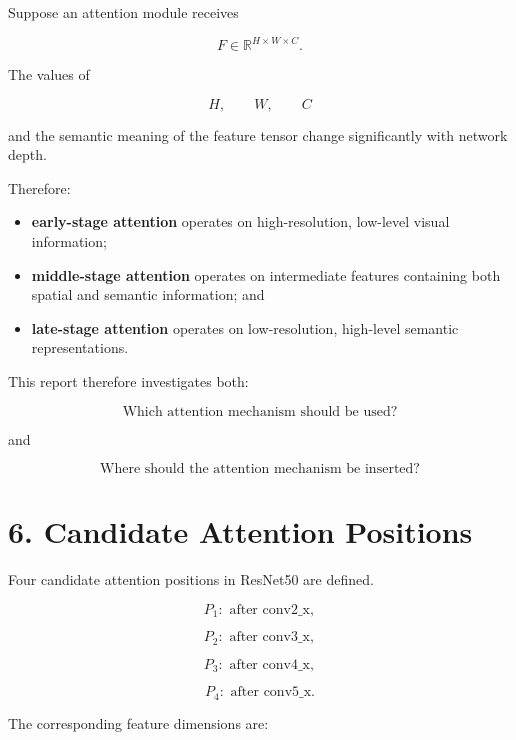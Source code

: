 \documentclass[10pt]{article}
\begin{document}
Suppose an attention module receives

\[
F\in\mathbb{R}^{H\times W\times C}.
\]

The values of

\[
H,\qquad W,\qquad C
\]

and the semantic meaning of the feature tensor change significantly with
network depth.

Therefore:

\begin{itemize}

\item \textbf{early-stage attention} operates on high-resolution,
low-level visual information;

\item \textbf{middle-stage attention} operates on intermediate features
containing both spatial and semantic information; and

\item \textbf{late-stage attention} operates on low-resolution,
high-level semantic representations.

\end{itemize}

This report therefore investigates both:

\[
\boxed{\text{Which attention mechanism should be used?}}
\]

and

\[
\boxed{\text{Where should the attention mechanism be inserted?}}
\]
\section*{6. Candidate Attention Positions}

Four candidate attention positions in ResNet50 are defined.

\[
P_1:
\text{ after conv2\_x},
\]

\[
P_2:
\text{ after conv3\_x},
\]

\[
P_3:
\text{ after conv4\_x},
\]

\[
P_4:
\text{ after conv5\_x}.
\]

The corresponding feature dimensions are:
\end{document}
